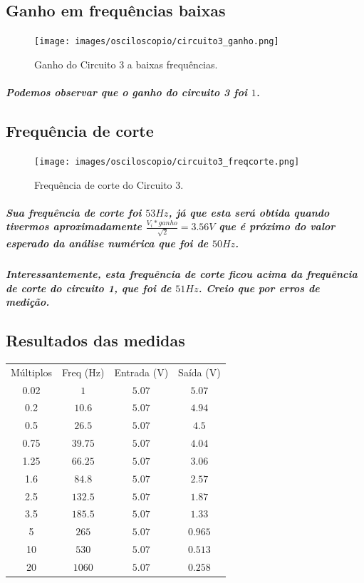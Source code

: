 \documentclass[12pt,twoside, a4paper, twocolumn]{article}
\begin{document}
\subsection{Ganho em frequências baixas}


\begin{figure}[h]
    \centering
    \texttt{[image: images/osciloscopio/circuito3\_ganho.png]}
    \caption{Ganho do Circuito 3 a baixas frequências.}
\end{figure}


\subparagraph{Podemos observar que o ganho do circuito 3 foi $1$.}




\subsection{Frequência de corte}


\begin{figure}[h]
    \centering
    \texttt{[image: images/osciloscopio/circuito3\_freqcorte.png]}
    \caption{Frequência de corte do Circuito 3.}
\end{figure}


\subparagraph{Sua frequência de corte foi $53Hz$, já que esta será obtida quando tivermos aproximadamente $\frac{V_i * ganho}{\sqrt[]{2}} = 3.56V$ que é próximo do valor esperado da análise numérica que foi de $50Hz$.}


\subparagraph*{Interessantemente, esta frequência de corte ficou acima da frequência de corte do circuito 1, que foi de $51Hz$. Creio que por erros de medição.}


\subsection{Resultados das medidas}
\begin{center}
    \begin{tabular}{ |c|c|c|c| }
        \hline
        Múltiplos & Freq (Hz) & Entrada (V) & Saída (V) \\
        0.02      & $1$       & $5.07$      & $5.07$    \\
        0.2       & $10.6$    & $5.07$      & $4.94$    \\
        0.5       & $26.5$    & $5.07$      & $4.5$     \\
        0.75      & $39.75$   & $5.07$      & $4.04$    \\
        1.25      & $66.25$   & $5.07$      & $3.06$    \\
        1.6       & $84.8$    & $5.07$      & $2.57$    \\
        2.5       & $132.5$   & $5.07$      & $1.87$    \\
        3.5       & $185.5$   & $5.07$      & $1.33$    \\
        5         & $265$     & $5.07$      & $0.965$   \\
        10        & $530$     & $5.07$      & $0.513$   \\
        20        & $1060$    & $5.07$      & $0.258$   \\
        \hline
    \end{tabular}
\end{center}
\end{document}
